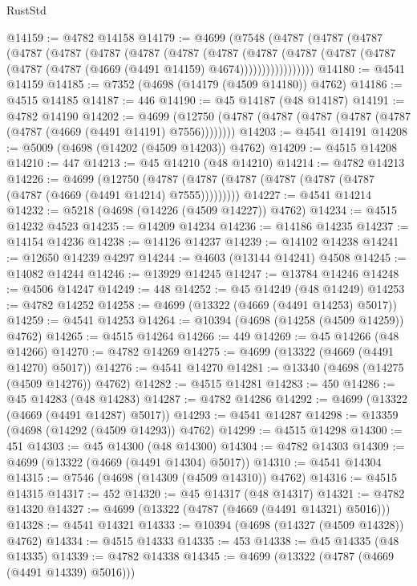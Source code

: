 \begin{lexlean}{RustStd}
\begin{coremodule}
@14159 := @4782 @14158
@14179 := @4699
    (@7548
      (@4787
        (@4787
          (@4787
            (@4787
              (@4787
                (@4787
                  (@4787
                    (@4787
                      (@4787
                        (@4787
                          (@4787
                            (@4787 (@4787 (@4787 (@4787 (@4669 (@4491 @14159) @4674)))))))))))))))))
@14180 := @4541 @14159
@14185 := @7352 (@4698 (@14179 (@4509 @14180)) @4762)
@14186 := @4515 @14185
@14187 := 446
@14190 := @45 @14187 (@48 @14187)
@14191 := @4782 @14190
@14202 := @4699
    (@12750 (@4787 (@4787 (@4787 (@4787 (@4787 (@4787 (@4669 (@4491 @14191) @7556))))))))
@14203 := @4541 @14191
@14208 := @5009 (@4698 (@14202 (@4509 @14203)) @4762)
@14209 := @4515 @14208
@14210 := 447
@14213 := @45 @14210 (@48 @14210)
@14214 := @4782 @14213
@14226 := @4699
    (@12750 (@4787 (@4787 (@4787 (@4787 (@4787 (@4787 (@4787 (@4669 (@4491 @14214) @7555)))))))))
@14227 := @4541 @14214
@14232 := @5218 (@4698 (@14226 (@4509 @14227)) @4762)
@14234 := @4515 @14232 @4523
@14235 := @14209 @14234
@14236 := @14186 @14235
@14237 := @14154 @14236
@14238 := @14126 @14237
@14239 := @14102 @14238
@14241 := @12650 @14239 @4297
@14244 := @4603 (@13144 @14241) @4508
@14245 := @14082 @14244
@14246 := @13929 @14245
@14247 := @13784 @14246
@14248 := @4506 @14247
@14249 := 448
@14252 := @45 @14249 (@48 @14249)
@14253 := @4782 @14252
@14258 := @4699 (@13322 (@4669 (@4491 @14253) @5017))
@14259 := @4541 @14253
@14264 := @10394 (@4698 (@14258 (@4509 @14259)) @4762)
@14265 := @4515 @14264
@14266 := 449
@14269 := @45 @14266 (@48 @14266)
@14270 := @4782 @14269
@14275 := @4699 (@13322 (@4669 (@4491 @14270) @5017))
@14276 := @4541 @14270
@14281 := @13340 (@4698 (@14275 (@4509 @14276)) @4762)
@14282 := @4515 @14281
@14283 := 450
@14286 := @45 @14283 (@48 @14283)
@14287 := @4782 @14286
@14292 := @4699 (@13322 (@4669 (@4491 @14287) @5017))
@14293 := @4541 @14287
@14298 := @13359 (@4698 (@14292 (@4509 @14293)) @4762)
@14299 := @4515 @14298
@14300 := 451
@14303 := @45 @14300 (@48 @14300)
@14304 := @4782 @14303
@14309 := @4699 (@13322 (@4669 (@4491 @14304) @5017))
@14310 := @4541 @14304
@14315 := @7546 (@4698 (@14309 (@4509 @14310)) @4762)
@14316 := @4515 @14315
@14317 := 452
@14320 := @45 @14317 (@48 @14317)
@14321 := @4782 @14320
@14327 := @4699 (@13322 (@4787 (@4669 (@4491 @14321) @5016)))
@14328 := @4541 @14321
@14333 := @10394 (@4698 (@14327 (@4509 @14328)) @4762)
@14334 := @4515 @14333
@14335 := 453
@14338 := @45 @14335 (@48 @14335)
@14339 := @4782 @14338
@14345 := @4699 (@13322 (@4787 (@4669 (@4491 @14339) @5016)))

\end{coremodule}
\end{lexlean}
